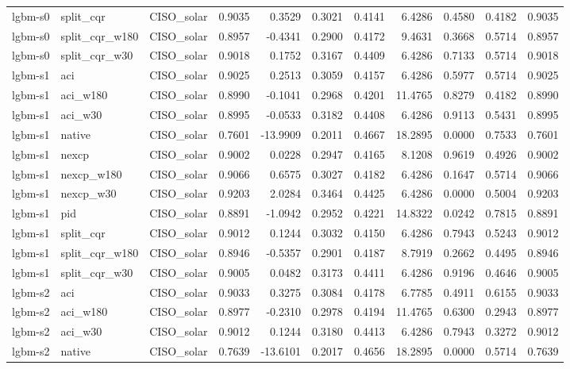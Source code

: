 \begin{tabular}{lllrrrrrrrr}
lgbm-s0 & split_cqr & CISO_solar & 0.9035 & 0.3529 & 0.3021 & 0.4141 & 6.4286 & 0.4580 & 0.4182 & 0.9035 \\
lgbm-s0 & split_cqr_w180 & CISO_solar & 0.8957 & -0.4341 & 0.2900 & 0.4172 & 9.4631 & 0.3668 & 0.5714 & 0.8957 \\
lgbm-s0 & split_cqr_w30 & CISO_solar & 0.9018 & 0.1752 & 0.3167 & 0.4409 & 6.4286 & 0.7133 & 0.5714 & 0.9018 \\
lgbm-s1 & aci & CISO_solar & 0.9025 & 0.2513 & 0.3059 & 0.4157 & 6.4286 & 0.5977 & 0.5714 & 0.9025 \\
lgbm-s1 & aci_w180 & CISO_solar & 0.8990 & -0.1041 & 0.2968 & 0.4201 & 11.4765 & 0.8279 & 0.4182 & 0.8990 \\
lgbm-s1 & aci_w30 & CISO_solar & 0.8995 & -0.0533 & 0.3182 & 0.4408 & 6.4286 & 0.9113 & 0.5431 & 0.8995 \\
lgbm-s1 & native & CISO_solar & 0.7601 & -13.9909 & 0.2011 & 0.4667 & 18.2895 & 0.0000 & 0.7533 & 0.7601 \\
lgbm-s1 & nexcp & CISO_solar & 0.9002 & 0.0228 & 0.2947 & 0.4165 & 8.1208 & 0.9619 & 0.4926 & 0.9002 \\
lgbm-s1 & nexcp_w180 & CISO_solar & 0.9066 & 0.6575 & 0.3027 & 0.4182 & 6.4286 & 0.1647 & 0.5714 & 0.9066 \\
lgbm-s1 & nexcp_w30 & CISO_solar & 0.9203 & 2.0284 & 0.3464 & 0.4425 & 6.4286 & 0.0000 & 0.5004 & 0.9203 \\
lgbm-s1 & pid & CISO_solar & 0.8891 & -1.0942 & 0.2952 & 0.4221 & 14.8322 & 0.0242 & 0.7815 & 0.8891 \\
lgbm-s1 & split_cqr & CISO_solar & 0.9012 & 0.1244 & 0.3032 & 0.4150 & 6.4286 & 0.7943 & 0.5243 & 0.9012 \\
lgbm-s1 & split_cqr_w180 & CISO_solar & 0.8946 & -0.5357 & 0.2901 & 0.4187 & 8.7919 & 0.2662 & 0.4495 & 0.8946 \\
lgbm-s1 & split_cqr_w30 & CISO_solar & 0.9005 & 0.0482 & 0.3173 & 0.4411 & 6.4286 & 0.9196 & 0.4646 & 0.9005 \\
lgbm-s2 & aci & CISO_solar & 0.9033 & 0.3275 & 0.3084 & 0.4178 & 6.7785 & 0.4911 & 0.6155 & 0.9033 \\
lgbm-s2 & aci_w180 & CISO_solar & 0.8977 & -0.2310 & 0.2978 & 0.4194 & 11.4765 & 0.6300 & 0.2943 & 0.8977 \\
lgbm-s2 & aci_w30 & CISO_solar & 0.9012 & 0.1244 & 0.3180 & 0.4413 & 6.4286 & 0.7943 & 0.3272 & 0.9012 \\
lgbm-s2 & native & CISO_solar & 0.7639 & -13.6101 & 0.2017 & 0.4656 & 18.2895 & 0.0000 & 0.5714 & 0.7639 \\

\end{tabular}
